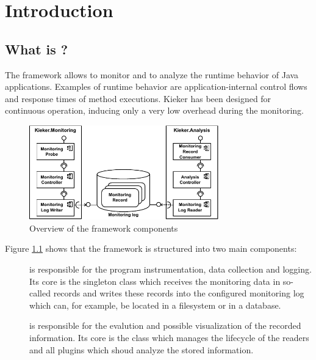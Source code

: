 \chapter{Introduction}
\section{What is \Kieker?}

The \Kieker{} framework allows to monitor and to analyze the runtime behavior %
of Java applications. Examples of runtime behavior are application-internal %
control flows and response times of method executions. %
Kieker has been designed for continuous operation, inducing only a very low %
overhead during the monitoring. 

\begin{figure}[H]\centering
\includegraphics[width=0.73\textwidth]{images/kiekerComponentDiagram-woCloud-bw-w-record-newNames}
\caption{Overview of the framework components}
\label{Figure:KiekerComponentDiagram}
\end{figure}
		
\noindent Figure \ref{Figure:KiekerComponentDiagram} shows that the framework %
is structured into two main components:%
\begin{description}
\item[\KiekerMonitoringPart]
is responsible for the program instrumentation, data %
collection and logging.  Its core is the singleton class  %
\notify which receives the monitoring data in so-called records and %
writes these records into the configured monitoring log which can, for example, %
be located in a filesystem or in a database.
\item[\KiekerAnalysisPart]
is responsible for the evalution and possible visualization of the %
recorded information. Its core is the class  \notify %
which manages the lifecycle of the readers and all plugins which shoud analyze %
the stored information.
\end{description}


